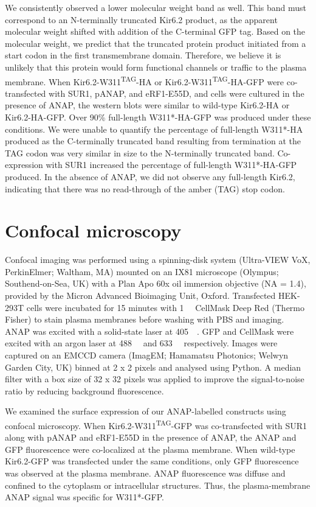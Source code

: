 We consistently observed a lower molecular weight band as well.
This band must correspond to an N-terminally truncated Kir6.2 product, as the apparent molecular weight shifted with addition of the C-terminal GFP tag.
Based on the molecular weight, we predict that the truncated protein product initiated from a start codon in the first transmembrane domain.
Therefore, we believe it is unlikely that this protein would form functional channels or traffic to the plasma membrane.
When Kir6.2-W311\textsuperscript{TAG}-HA or Kir6.2-W311\textsuperscript{TAG}-HA-GFP were co-transfected with SUR1, pANAP, and eRF1-E55D, and cells were cultured in the presence of ANAP, the western blots were similar to wild-type Kir6.2-HA or Kir6.2-HA-GFP.
Over 90\% full-length W311*-HA-GFP was produced under these conditions.
We were unable to quantify the percentage of full-length W311*-HA produced as the C-terminally truncated band resulting from termination at the TAG codon was very similar in size to the N-terminally truncated band.
Co-expression with SUR1 increased the percentage of full-length W311*-HA-GFP produced.
In the absence of ANAP, we did not observe any full-length Kir6.2, indicating that there was no read-through of the amber (TAG) stop codon.

\section{Confocal microscopy}
Confocal imaging was performed using a spinning-disk system (Ultra-VIEW VoX, PerkinElmer; Waltham, MA) mounted on an IX81 microscope (Olympus; Southend-on-Sea, UK) with a Plan Apo 60x oil immersion objective (NA = 1.4), provided by the Micron Advanced Bioimaging Unit, Oxford.
Transfected HEK-293T cells were incubated for 15 minutes with \SI{1}{\nano\Molar} CellMask Deep Red (Thermo Fisher) to stain plasma membranes before washing with PBS and imaging.
ANAP was excited with a solid-state laser at \SI{405}{\nano\Molar}.
GFP and CellMask were excited with an argon laser at \SI{488}{\nano\Molar} and \SI{633}{\nano\Molar} respectively.
Images were captured on an EMCCD camera (ImagEM; Hamamatsu Photonics; Welwyn Garden City, UK) binned at 2 x 2 pixels and analysed using Python.
A median filter with a box size of 32 x 32 pixels was applied to improve the signal-to-noise ratio by reducing background fluorescence.

We examined the surface expression of our ANAP-labelled constructs using confocal microscopy.
When Kir6.2-W311\textsuperscript{TAG}-GFP was co-transfected with SUR1 along with pANAP and eRF1-E55D in the presence of ANAP, the ANAP and GFP fluorescence were co-localized at the plasma membrane.
When wild-type Kir6.2-GFP was transfected under the same conditions, only GFP fluorescence was observed at the plasma membrane.
ANAP fluorescence was diffuse and confined to the cytoplasm or intracellular structures.
Thus, the plasma-membrane ANAP signal was specific for W311*-GFP.

